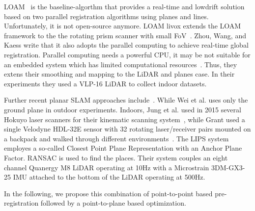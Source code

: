 LOAM~\cite{Zhang2014} is the baseline-algorthm that provides a real-time and lowdrift solution based on two parallel registration algorithms using planes and lines.
Unfortunately, it is not open-source anymore.
LOAM livox extends the LOAM framework to the the rotating prism scanner with small FoV~\cite{Lin_2020}.
Zhou, Wang, and Kaess write that it also adopts the parallel computing to achieve real-time global registration.
Parallel computing needs a powerful CPU, it may be not suitable for an embedded system which has limited computational resources~\cite{Zhou_2021}.
Thus, they extens their smoothing and mapping to the LiDAR and planes case.
In their experiments they used a VLP-16 LiDAR to collect indoor datasets.

Further recent planar SLAM approaches include~\cite{Jung_2015,Grant_2018,Geneva_2018, Zhou_2021,   wei2021groundslam}.
While Wei et al. uses only the ground plane in outdoor experiments.
Indoors, Jung et al. used in 2015 several Hokuyo laser scanners for their kinematic scanning system~\cite{Jung_2015}, while Grant used a single Velodyne HDL-32E sensor with 32 rotating laser/receiver pairs mounted on a backpack and walked through different environments~\cite{Grant_2018}.
The LIPS system~\cite{Geneva_2018} employes a so-called Closest Point Plane Representation with an Anchor Plane Factor.
RANSAC is used to find the places.
Their system couples an eight channel Quanergy M8 LiDAR operating at 10Hz with a Microstrain 3DM-GX3-25 IMU attached to the bottom of the LiDAR operating at 500Hz.

\bigskip

In the following, we propose this combination of point-to-point based pre-registration followed by a point-to-plane based optimization. 
